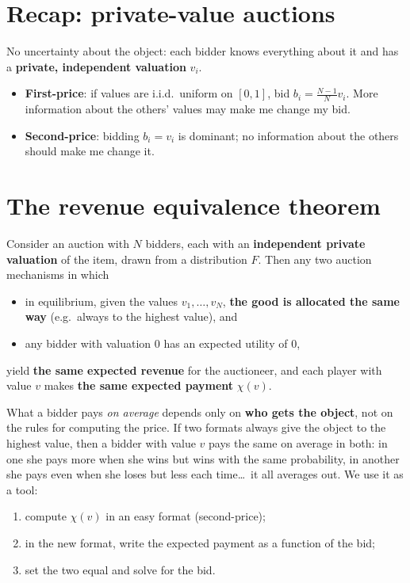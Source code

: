 \documentclass[11pt,a4paper,openany]{book}
\begin{document}
\section{Recap: private-value auctions}

\begin{rembox}[title=Last lecture]
No uncertainty about the object: each bidder knows everything about it and has a
\textbf{private, independent valuation} $v_i$.
\begin{itemize}
  \item \textbf{First-price}: if values are i.i.d.\ uniform on $[0,1]$, bid
        $b_i = \frac{N-1}{N} v_i$. More information about the others' values may make me
        change my bid.
  \item \textbf{Second-price}: bidding $b_i = v_i$ is dominant; no information about the
        others should make me change it.
\end{itemize}
\end{rembox}


\section{The revenue equivalence theorem}

\begin{thmbox}[title=Revenue equivalence theorem]
Consider an auction with $N$ bidders, each with an \textbf{independent private valuation} of
the item, drawn from a distribution $F$. Then any two auction mechanisms in which
\begin{itemize}
  \item in equilibrium, given the values $v_1, \ldots, v_N$, \textbf{the good is allocated
        the same way} (e.g.\ always to the highest value), and
  \item any bidder with valuation 0 has an expected utility of 0,
\end{itemize}
yield \textbf{the same expected revenue} for the auctioneer, and each player with value $v$
makes \textbf{the same expected payment} $\chi(v)$.
\end{thmbox}

\begin{rembox}[title=In plain words]
What a bidder pays \emph{on average} depends only on \textbf{who gets the object}, not on the
rules for computing the price. If two formats always give the object to the highest value,
then a bidder with value $v$ pays the same on average in both: in one she pays more when she
wins but wins with the same probability, in another she pays even when she loses but less
each time\dots\ it all averages out. We use it as a tool:
\begin{enumerate}
  \item compute $\chi(v)$ in an easy format (second-price);
  \item in the new format, write the expected payment as a function of the bid;
  \item set the two equal and solve for the bid.
\end{enumerate}
\end{rembox}
\end{document}
